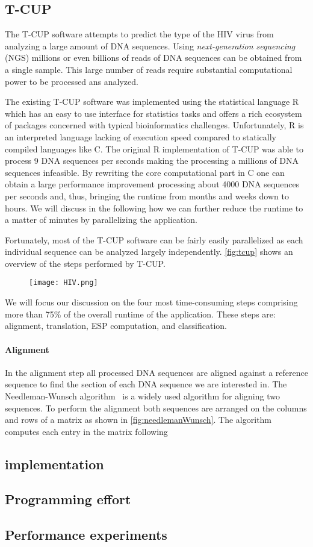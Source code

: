 \subsection*{T-CUP}
The T-CUP software attempts to predict the type of the HIV virus from analyzing a large amount of DNA sequences.
Using \emph{next-generation sequencing} ({\small NGS}) millions or even billions of reads of DNA sequences can be obtained from a single sample.
This large number of reads require substantial computational power to be processed ans analyzed.

The existing T-CUP software was implemented using the statistical language R which has an easy to use interface for statistics tasks and offers a rich ecosystem of packages concerned with typical bioinformatics challenges.
Unfortunately, R is an interpreted language lacking of execution speed compared to statically compiled languages like C.
The original R implementation of T-CUP was able to process 9 DNA sequences per seconds making the processing a millions of DNA sequences infeasible.
By rewriting the core computational part in C one can obtain a large performance improvement processing about 4000 DNA sequences per seconds and, thus, bringing the runtime from months and weeks down to hours.
We will discuss in the following how we can further reduce the runtime to a matter of minutes by parallelizing the application.

Fortunately, most of the T-CUP software can be fairly easily parallelized as each individual sequence can be analyzed largely independently.
\autoref{fig:tcup} shows an overview of the steps performed by T-CUP.
\begin{figure}
  \centering
  \texttt{[image: HIV.png]}
  \caption[]%
          {}
  \label{fig:tcup}
\end{figure}
We will focus our discussion on the four most time-consuming steps comprising more than 75\% of the overall runtime of the application.
These steps are: alignment, translation, ESP computation, and classification.

\paragraph{Alignment}
In the alignment step all processed DNA sequences are aligned against a reference sequence to find the section of each DNA sequence we are interested in.
The Needleman-Wunsch algorithm~\cite{} is a widely used algorithm for aligning two sequences.
To perform the alignment both sequences are arranged on the columns and rows of a matrix as shown in \autoref{fig:needlemanWunsch}.
The algorithm computes each entry in the matrix following

\subsection*{\SkelCL implementation}

\subsection*{Programming effort}

\subsection*{Performance experiments}


